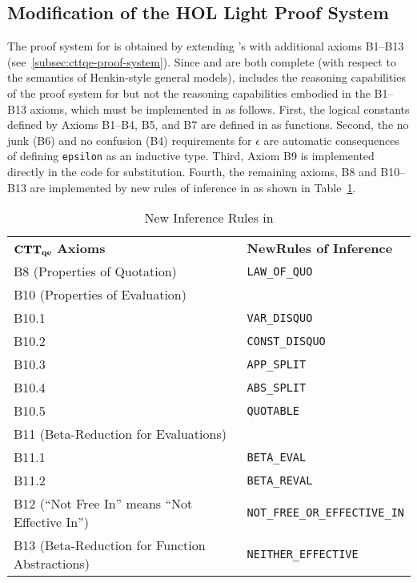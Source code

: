 \documentclass[fleqn]{llncs}
\begin{document}
\subsection{Modification of the HOL Light Proof System}\label{subsec:hlqe-proof-system}

The proof system for {\churchqe} is obtained by extending {\qzero}'s
with additional axioms B1--B13 (see~\ref{subsec:cttqe-proof-system}).
Since {\qzero} and
{\HL} are both complete (with respect to the semantics of Henkin-style
general models), {\HL} includes the reasoning capabilities of the proof
system for {\qzero} but not the reasoning capabilities
embodied in the B1--B13 axioms, which must be
implemented in {\HLQE} as follows.
First, the logical constants defined by
Axioms B1--B4, B5, and B7 are defined in {\HLQE} as {\HOL} functions.
Second, the no junk (B6) and no confusion (B4) requirements for
$\epsilon$ are automatic consequences of defining \texttt{epsilon} as
an inductive type.  Third, Axiom B9 is implemented directly
in the {\HL} code for substitution.  Fourth, the remaining axioms, B8
and B10--B13 are implemented by new rules of inference in as
shown in Table~\ref{tab:axioms}.

\begin{table}
\bc
\begin{tabular}{|ll|}
\hline
${\bf CTT_{qe}}$ \textbf{Axioms}                & \textbf{NewRules of Inference}\\
B8 (Properties of Quotation)                     & \texttt{LAW\_OF\_QUO}\\
B10 (Properties of Evaluation)                   & \texttt{}\\
B10.1                                            & \texttt{VAR\_DISQUO}\\
B10.2                                            & \texttt{CONST\_DISQUO}\\
B10.3                                            & \texttt{APP\_SPLIT}\\
B10.4                                            & \texttt{ABS\_SPLIT}\\
B10.5                                            & \texttt{QUOTABLE}\\
B11 (Beta-Reduction for Evaluations)             & \texttt{}\\
B11.1                                            & \texttt{BETA\_EVAL}\\
B11.2                                            & \texttt{BETA\_REVAL}\\
B12 (``Not Free In'' means ``Not Effective In'') & \texttt{NOT\_FREE\_OR\_EFFECTIVE\_IN}\\
B13 (Beta-Reduction for Function Abstractions)  & \texttt{NEITHER\_EFFECTIVE}\\
\hline
\end{tabular}
\ec
\caption{New Inference Rules in {\HLQE}}\label{tab:axioms} 
\end{table}
\end{document}
